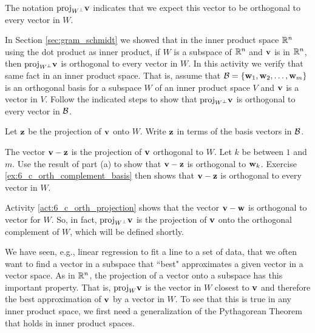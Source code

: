 The notation $\text{proj}_{W^{\perp}} \mathbf{v}$ indicates that we expect this vector to be orthogonal to every vector in $W$. 

\begin{activity} \label{act:6_c_orth_projection} In Section \ref{sec:gram_schmidt} we showed that in the inner product space $\mathbb{R}^n$ using the dot product as inner product, if $W$ is a subspace of $\mathbb{R}^n$ and $\mathbf{v}$ is in $\mathbb{R}^n$, then $\text{proj}_{W^{\perp}} \mathbf{v}$ is orthogonal to every vector in $W$. In this activity we verify that same fact in an inner product space. That is, assume that $\mathcal{B} = \{\mathbf{w}_1, \mathbf{w}_2, \ldots, \mathbf{w}_m\}$ is an orthogonal basis for a subspace $W$ of an inner product space $V$ and $\mathbf{v}$ is a vector in $V$. Follow the indicated steps to show that $\text{proj}_{W^{\perp}} \mathbf{v}$ is orthogonal to every vector in $\mathcal{B}$. 
\ba
\item Let $\mathbf{z}$ be the projection of $\mathbf{v}$ onto $W$. Write $\mathbf{z}$ in terms of the basis vectors in $\mathcal{B}$. 

\item The vector $\mathbf{v} - \mathbf{z}$ is the projection of $\mathbf{v}$ orthogonal to $W$. Let $k$ be between $1$ and $m$. Use the result of part (a) to show that $\mathbf{v} - \mathbf{z}$ is orthogonal to $\mathbf{w}_k$. Exercise  \ref{ex:6_c_orth_complement_basis} then shows that $\mathbf{v} - \mathbf{z}$ is orthogonal to every vector in $W$. 


\ea

\end{activity}

Activity \ref{act:6_c_orth_projection} shows that the vector $\mathbf{v} - \mathbf{w}$ is orthogonal to vector for $W$. So, in fact, $\text{proj}_{W^\perp} \mathbf{v}$ is the projection of $\mathbf{v}$ onto the orthogonal complement of $W$, which will be defined shortly. 
 

We have seen, e.g., linear regression to fit a line to a set of data, that we often want to find a vector in a subspace that ``best" approximates a given vector in a vector space. As in $\mathbb{R}^n$, the projection of a vector onto a subspace has this important property.  That is, $\text{proj}_W \mathbf{v}$ is the vector in $W$ closest to $\mathbf{v}$ and therefore the best approximation of $\mathbf{v}$ by a vector in $W$. To see that this is true in any inner product space, we first need a generalization of the Pythagorean Theorem that holds in inner product spaces.

